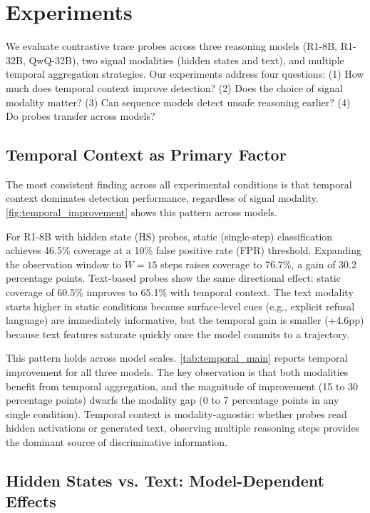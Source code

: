 \section{Experiments}
\label{sec:experiments}

We evaluate contrastive trace probes across three reasoning models (R1-8B, R1-32B, QwQ-32B), two signal modalities (hidden states and text), and multiple temporal aggregation strategies. Our experiments address four questions: (1) How much does temporal context improve detection? (2) Does the choice of signal modality matter? (3) Can sequence models detect unsafe reasoning earlier? (4) Do probes transfer across models?

\subsection{Temporal Context as Primary Factor}
\label{sec:temporal_primary}

The most consistent finding across all experimental conditions is that temporal context dominates detection performance, regardless of signal modality. \cref{fig:temporal_improvement} shows this pattern across models.

For R1-8B with hidden state (HS) probes, static (single-step) classification achieves 46.5\% coverage at a 10\% false positive rate (FPR) threshold. Expanding the observation window to $W{=}15$ steps raises coverage to 76.7\%, a gain of 30.2 percentage points. Text-based probes show the same directional effect: static coverage of 60.5\% improves to 65.1\% with temporal context. The text modality starts higher in static conditions because surface-level cues (e.g., explicit refusal language) are immediately informative, but the temporal gain is smaller (+4.6pp) because text features saturate quickly once the model commits to a trajectory.

This pattern holds across model scales. \cref{tab:temporal_main} reports temporal improvement for all three models. The key observation is that both modalities benefit from temporal aggregation, and the magnitude of improvement (15 to 30 percentage points) dwarfs the modality gap (0 to 7 percentage points in any single condition). Temporal context is modality-agnostic: whether probes read hidden activations or generated text, observing multiple reasoning steps provides the dominant source of discriminative information.

\subsection{Hidden States vs. Text: Model-Dependent Effects}
\label{sec:hs_vs_text}

